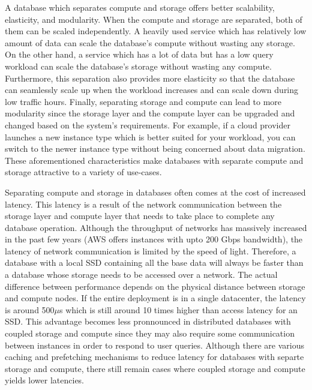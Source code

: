 \medskip
A database which separates compute and storage offers better scalability,
elasticity, and modularity. When the compute and storage are
separated, both of them can be scaled independently. A heavily used service
which has relatively low amount of data can scale the database's compute without
wasting any storage. On the other hand, a service which has a lot of data but
has a low query workload can scale the database's storage without wasting any
compute. Furthermore, this separation also provides more elasticity so that the
database can seamlessly scale up when the workload increases and can scale down
during low traffic hours. Finally, separating storage and compute can lead to
more modularity since the storage layer and the compute layer can be upgraded
and changed based on the system's requirements. For example, if a cloud provider
launches a new instance type which is better suited for your workload, you can
switch to the newer instance type without being concerned about data migration.
These aforementioned characteristics make databases with separate compute and
storage attractive to a variety of use-cases.

\medskip
Separating compute and storage in databases often comes at the cost of increased
latency. This latency is a result of the network communication between the
storage layer and compute layer that needs to take place to complete any
database operation. Although the throughput of networks has massively increased
in the past few years (AWS offers instances with upto 200 Gbps bandwidth), the
latency of network communication is limited by the speed of light. Therefore, a
database with a local SSD containing all the base data will always be faster
than a database whose storage needs to be accessed over a network. The actual
difference between performance depends on the physical distance between storage
and compute nodes. If the entire deployment is in a single datacenter, the
latency is around 500$\mu$s which is still around 10 times higher than access latency
for an SSD\cite{jiang2021fusionraid}. This advantage becomes less pronnounced in
distributed databases with coupled storage and compute since they may also require
some communication between instances in order to respond to user queries.
Although there are various caching and prefetching mechanisms to reduce latency
for databases with separte storage and compute, there still remain cases where
coupled storage and compute yields lower latencies.


